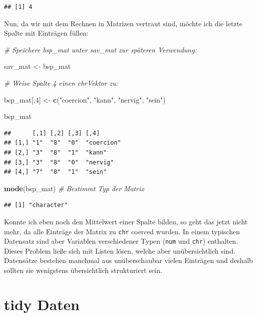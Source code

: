 \documentclass[
  ngerman,
]{book}
\newenvironment{Shaded}{\begin{snugshade}}{\end{snugshade}}
\newcommand{\CommentTok}[1]{\textcolor[rgb]{0.56,0.35,0.01}{\textit{#1}}}
\newcommand{\DecValTok}[1]{\textcolor[rgb]{0.00,0.00,0.81}{#1}}
\newcommand{\FunctionTok}[1]{\textcolor[rgb]{0.13,0.29,0.53}{\textbf{#1}}}
\newcommand{\NormalTok}[1]{#1}
\newcommand{\OtherTok}[1]{\textcolor[rgb]{0.56,0.35,0.01}{#1}}
\newcommand{\StringTok}[1]{\textcolor[rgb]{0.31,0.60,0.02}{#1}}
\begin{document}
\begin{verbatim}
## [1] 4
\end{verbatim}

Nun, da wir mit dem Rechnen in Matrizen vertraut sind, möchte ich die letzte Spalte mit Einträgen füllen:

\begin{Shaded}
\begin{Highlighting}[]
\CommentTok{\# Speichere bsp\_mat unter sav\_mat zur späteren Verwendung:}

\NormalTok{sav\_mat }\OtherTok{\textless{}{-}}\NormalTok{ bsp\_mat}

\CommentTok{\# Weise Spalte 4 einen \textasciigrave{}chr\textasciigrave{}{-}Vektor zu:}

\NormalTok{bsp\_mat[,}\DecValTok{4}\NormalTok{] }\OtherTok{\textless{}{-}} \FunctionTok{c}\NormalTok{(}\StringTok{"coercion"}\NormalTok{, }\StringTok{"kann"}\NormalTok{, }\StringTok{"nervig"}\NormalTok{, }\StringTok{"sein"}\NormalTok{)}

\NormalTok{bsp\_mat}
\end{Highlighting}
\end{Shaded}

\begin{verbatim}
##      [,1] [,2] [,3] [,4]      
## [1,] "1"  "8"  "0"  "coercion"
## [2,] "3"  "8"  "1"  "kann"    
## [3,] "3"  "8"  "0"  "nervig"  
## [4,] "7"  "8"  "1"  "sein"
\end{verbatim}

\begin{Shaded}
\begin{Highlighting}[]
\FunctionTok{mode}\NormalTok{(bsp\_mat) }\CommentTok{\# Bestimmt Typ der Matrix}
\end{Highlighting}
\end{Shaded}

\begin{verbatim}
## [1] "character"
\end{verbatim}

Konnte ich eben noch den Mittelwert einer Spalte bilden, so geht das jetzt nicht mehr, da alle Einträge der Matrix zu \texttt{chr} coerced wurden. In einem typischen Datensatz sind aber Variablen verschiedener Typen (\texttt{num} und \texttt{chr}) enthalten. Dieses Problem ließe sich mit Listen lösen, welche aber unübersichtlich sind. Datensätze bestehen manchmal aus unüberschaubar vielen Einträgen und deshalb sollten sie wenigstens übersichtlich strukturiert sein.

\section{tidy Daten}\label{tidy-daten}
\end{document}
